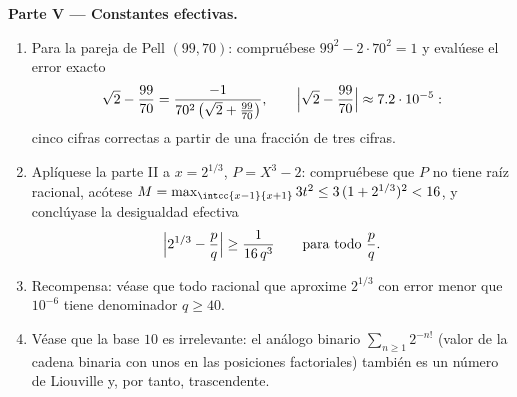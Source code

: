 \begin{problem}
\medskip
\noindent\textbf{Parte V --- Constantes efectivas.}
\begin{enumerate}[resume]
  \item Para la pareja de Pell $(99, 70)$: compruébese
        $99^2 - 2\cdot70^2 = 1$ y evalúese el error exacto
        \[
        \sqrt2 - \frac{99}{70}
        = \frac{-1}{70^2\,\bigl(\sqrt2 + \frac{99}{70}\bigr)},
        \qquad
        \Bigl|\sqrt 2 - \frac{99}{70}\Bigr| \approx 7.2\cdot
        10^{-5} :
        \]
        cinco cifras correctas a partir de una fracción de tres
        cifras.
  \item Aplíquese la parte II a $x = 2^{1/3}$, $P = X^3 - 2$:
        compruébese que $P$ no tiene raíz racional, acótese
        $M = \max_{\intcc{x-1}{x+1}} 3t^2 \leq 3\,(1 + 2^{1/3})^2 <
        16$, y conclúyase la desigualdad efectiva
        \[
        \Bigl| 2^{1/3} - \frac pq \Bigr| \geq
        \frac{1}{16\,q^3} \qquad \text{para todo } \frac pq .
        \]
  \item Recompensa: véase que todo racional que aproxime $2^{1/3}$
        con error menor que $10^{-6}$ tiene denominador $q \geq 40$.
  \item Véase que la base $10$ es irrelevante: el análogo binario
        $\sum_{n\geq1} 2^{-n!}$ (valor de la cadena binaria con unos
        en las posiciones factoriales) también es un número de
        Liouville y, por tanto, trascendente.
\end{enumerate}


\end{problem}

